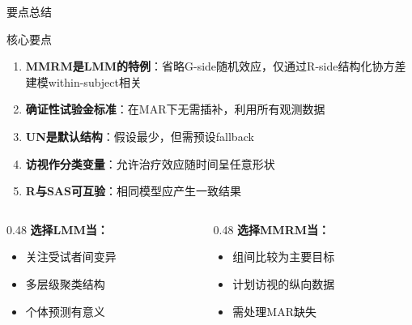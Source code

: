 \documentclass[aspectratio=169,11pt]{beamer}
\begin{document}
\begin{frame}{要点总结}
\begin{block}{核心要点}
\begin{enumerate}
    \item \textbf{MMRM是LMM的特例}：省略G-side随机效应，仅通过R-side结构化协方差建模within-subject相关
    \item \textbf{确证性试验金标准}：在MAR下无需插补，利用所有观测数据
    \item \textbf{UN是默认结构}：假设最少，但需预设fallback
    \item \textbf{访视作分类变量}：允许治疗效应随时间呈任意形状
    \item \textbf{R与SAS可互验}：相同模型应产生一致结果
\end{enumerate}
\end{block}

\vspace{0.2cm}
\begin{columns}[T,totalwidth=\textwidth]
\begin{column}{0.48\textwidth}
\textbf{选择LMM当：}
\begin{itemize}
    \item 关注受试者间变异
    \item 多层级聚类结构
    \item 个体预测有意义
\end{itemize}
\end{column}
\begin{column}{0.48\textwidth}
\textbf{选择MMRM当：}
\begin{itemize}
    \item 组间比较为主要目标
    \item 计划访视的纵向数据
    \item 需处理MAR缺失
\end{itemize}
\end{column}
\end{columns}
\end{frame}
\end{document}
